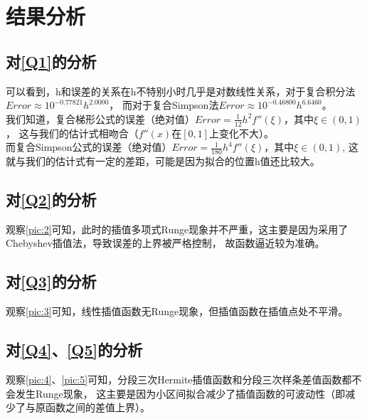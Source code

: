 \documentclass[a4paper,11pt,notitlepage]{article}
\begin{document}
\section{结果分析}
\subsection{对\ref{Q1}的分析}
可以看到，h和误差的关系在h不特别小时几乎是对数线性关系，对于复合积分法$Error\approx 10^{-0.77821}h^{2.0000}$，
而对于复合Simpson法$Error\approx 10^{-0.46800}h^{6.6460}$。\\
我们知道，复合梯形公式的误差（绝对值）$Error=\frac{1}{12}h^2f''(\xi )$，其中$\xi \in (0,1)$，
这与我们的估计式相吻合（$f''(x)$在$[0,1]$上变化不大）。\\
而复合Simpson公式的误差（绝对值）$Error=\frac{1}{180}h^4f''(\xi )$，其中$\xi \in (0,1)$,
这就与我们的估计式有一定的差距，可能是因为拟合的位置h值还比较大。


\subsection{对\ref{Q2}的分析}
观察\cref{pic:2}可知，此时的插值多项式Runge现象并不严重，这主要是因为采用了Chebyshev插值法，导致误差的上界被严格控制，
故函数逼近较为准确。

\subsection{对\ref{Q3}的分析}
观察\cref{pic:3}可知，线性插值函数无Runge现象，但插值函数在插值点处不平滑。

\subsection{对\ref{Q4}、\ref{Q5}的分析}
观察\cref{pic:4}、\cref{pic:5}可知，分段三次Hermite插值函数和分段三次样条差值函数都不会发生Runge现象，
这主要是因为小区间拟合减少了插值函数的可波动性（即减少了与原函数之间的差值上界）。
\end{document}
